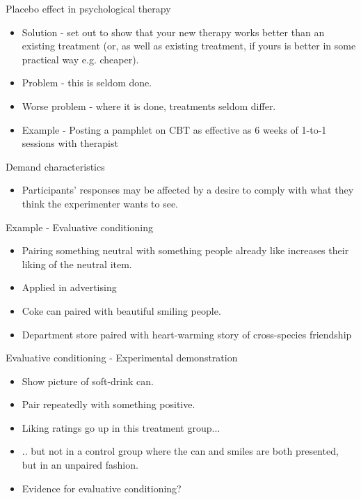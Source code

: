 \documentclass{beamer}
\begin{document}
\begin{frame}{Placebo effect in psychological therapy}
\begin{itemize}
\item Solution - set out to show that your new therapy works better than an existing treatment (or, as well as existing treatment, if yours is better in some practical way e.g. cheaper).
\item Problem - this is seldom done.
\item Worse problem - where it is done, treatments seldom differ. 
\item Example - Posting a pamphlet on CBT as effective as 6 weeks of 1-to-1 sessions with therapist
\end{itemize}
\end{frame}



\begin{frame}{Demand characteristics}
\begin{itemize}
\item Participants' responses may be affected by a desire to comply with what they think the experimenter wants to see.
\end{itemize}
\end{frame}



\begin{frame}{Example - Evaluative conditioning}
\begin{itemize}
\item Pairing something neutral with something people already like increases their liking of the neutral item.
\item Applied in advertising
\item Coke can paired with beautiful smiling people.
\item Department store paired with heart-warming story of cross-species friendship 
\end{itemize}
\end{frame}

\begin{frame}{Evaluative conditioning - Experimental demonstration}
\begin{itemize}
\item Show picture of soft-drink can.
\item Pair repeatedly with something positive.
\item Liking ratings go up in this treatment group...
\item .. but not in a control group where the can and smiles are both presented, but in an unpaired fashion. 
\item Evidence for evaluative conditioning?
\end{itemize}
\end{frame}
\end{document}
